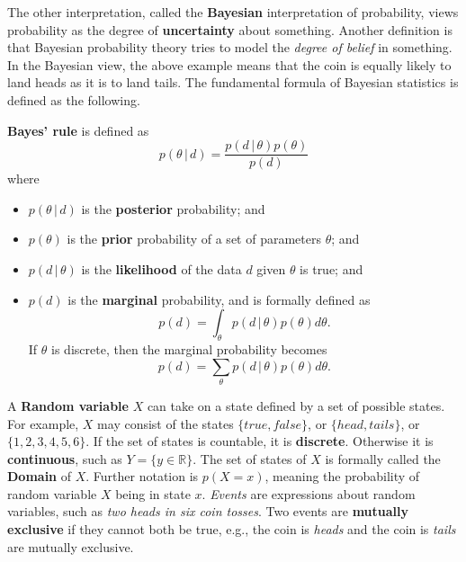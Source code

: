 \documentclass{article}
\begin{document}
The other interpretation, called the \textbf{Bayesian} interpretation of probability, views probability as the degree of \textbf{uncertainty} about something. Another definition is that Bayesian probability theory tries to model the \textit{degree of belief} in something. In the Bayesian view, the above example means that the coin is equally likely to land heads as it is to land tails. The fundamental formula of Bayesian statistics is defined as the following.   
\\
\begin{theorem}
    \textbf{Bayes' rule} is defined as
    $$
        p(\theta \,|\, d) = \frac{p(d \,|\, \theta)p(\theta)}{p(d)}
    $$
    where
    \begin{itemize}
        \item $p(\theta \,|\, d)$ is the \textbf{posterior} probability; and
        \item $p(\theta)$ is the \textbf{prior} probability of a set of parameters $\theta$; and
        \item $p(d \,|\, \theta)$ is the \textbf{likelihood} of the data $d$ given $\theta$ is true; and
        \item $p(d)$ is the \textbf{marginal} probability, and is formally defined as 
        $$
            p(d) = \int_{\theta} p(d \,|\, \theta)p(\theta) d\theta .
        $$
        If $\theta$ is discrete, then the marginal probability becomes 
        $$
            p(d) = \sum_{\theta} p(d \,|\, \theta)p(\theta) d\theta .
        $$
    \end{itemize}
\end{theorem}
\noindent A \textbf{Random variable} $X$ can take on a state defined by a set of possible states. For example, $X$ may consist of the states $\{true, false\}$, or $\{head, tails\}$, or $\{1, 2, 3, 4, 5, 6\}$. If the set of states is countable, it is \textbf{discrete}. Otherwise it is \textbf{continuous}, such as $Y = \{ y \in \mathbb{R}\}$. The set of states of $X$ is formally called the \textbf{Domain} of $X$. Further notation is $p(X = x)$, meaning the probability of random variable $X$ being in state $x$. \textit{Events} are expressions about random variables, such as \textit{two heads in six coin tosses}. Two events are \textbf{mutually exclusive} if they cannot both be true, e.g., the coin is \textit{heads} and the coin is \textit{tails} are mutually exclusive. 
\end{document}
